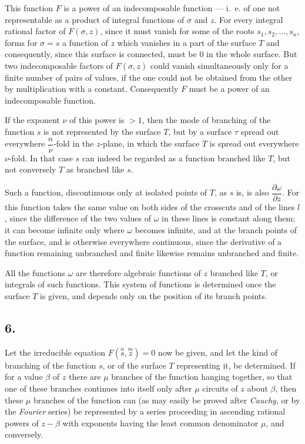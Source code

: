 \documentclass{article}
\begin{document}
This function $F$ is a power of an indecomposable function --- i.~e. of one not representable as a product of integral functions of $\sigma$ and $z$. For every integral rational factor of $F(\sigma, z)$, since it must vanish for some of the roots $s_{1}, s_{2}, \ldots, s_{n}$, forms for $\sigma = s$ a function of $z$ which vanishes in a part of the surface $T$ and consequently, since this surface is connected, must be 0 in the whole surface. But two indecomposable factors of $F(\sigma, z)$ could vanish simultaneously only for a finite number of pairs of values, if the one could not be obtained from the other by multiplication with a constant. Consequently $F$ must be a power of an indecomposable function.

If the exponent $\nu$ of this power is $> 1$, then the mode of branching of the function $s$ is not represented by the surface $T$, but by a surface $\tau$ spread out everywhere $\dfrac{n}{\nu}$-fold in the $z$-plane, in which the surface $T$ is spread out everywhere $\nu$-fold. In that case $s$ can indeed be regarded as a function branched like $T$, but not conversely $T$ as branched like $s$.

Such a function, discontinuous only at isolated points of $T$, as $s$ is, is also $\dfrac{\partial\omega}{\partial z}$. For this function takes the same value on both sides of the crosscuts and of the lines $l$, since the difference of the two values of $\omega$ in these lines is constant along them; it can become infinite only where $\omega$ becomes infinite, and at the branch points of the surface, and is otherwise everywhere continuous, since the derivative of a function remaining unbranched and finite likewise remains unbranched and finite.

All the functions $\omega$ are therefore algebraic functions of $z$ branched like $T$, or integrals of such functions. This system of functions is determined once the surface $T$ is given, and depends only on the position of its branch points.

\subsection*{6.}

Let the irreducible equation $F(\overset{n}{s}, \overset{m}{z}) = 0$ now be given, and let the kind of branching of the function $s$, or of the surface $T$ representing it, be determined. If for a value $\beta$ of $z$ there are $\mu$ branches of the function hanging together, so that one of these branches continues into itself only after $\mu$ circuits of $z$ about $\beta$, then these $\mu$ branches of the function can (as may easily be proved after \emph{Cauchy}, or by the \emph{Fourier} series) be represented by a series proceeding in ascending rational powers of $z-\beta$ with exponents having the least common denominator $\mu$, and conversely.
\end{document}
